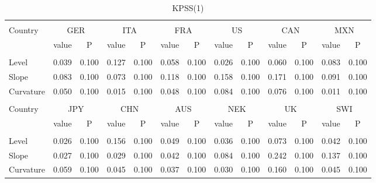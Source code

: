 \documentclass{article}
\begin{document}

\begin{table}[h]
\caption{KPSS(1)} %
\fontsize{10}{10}\selectfont
\centering%
\begin{tabular}{l cc cc cc cc cc cc}%
\hline\hline \\ [-1.5ex]                         %

Country	&	\multicolumn{2}{c}{GER}			&	\multicolumn{2}{c}{ITA}			&	\multicolumn{2}{c}{FRA}			&	\multicolumn{2}{c}{US}			&	\multicolumn{2}{c}{CAN}			&	\multicolumn{2}{c}{MXN}			\\[0.5ex] 

 & value &P & value &P& value &P & value &P& value &P & value &P\\

\hline       \\ [-1.5ex] 

Level	&	0.039	&	0.100	&	0.127	&	0.100	&	0.058	&	0.100	&	0.026	&	0.100	&	0.060	&	0.100	&	0.083	&	0.100	\\
Slope	&	0.083	&	0.100	&	0.073	&	0.100	&	0.118	&	0.100	&	0.158	&	0.100	&	0.171	&	0.100	&	0.091	&	0.100	\\
Curvature	&	0.050	&	0.100	&	0.015	&	0.100	&	0.048	&	0.100	&	0.084	&	0.100	&	0.076	&	0.100	&	0.011	&	0.100	\\


\hline\hline   \\ [-1.5ex]    

Country	&	\multicolumn{2}{c}{JPY}			&	\multicolumn{2}{c}{CHN}			&	\multicolumn{2}{c}{AUS}			&	\multicolumn{2}{c}{NEK}			&	\multicolumn{2}{c}{UK}			&	\multicolumn{2}{c}{SWI}			\\

 & value &P & value &P& value &P & value &P& value &P & value &P\\

\hline       \\ [-1.5ex] 

Level	&	0.026	&	0.100	&	0.156	&	0.100	&	0.049	&	0.100	&	0.036	&	0.100	&	0.073	&	0.100	&	0.042	&	0.100	\\
Slope	&	0.027	&	0.100	&	0.029	&	0.100	&	0.042	&	0.100	&	0.084	&	0.100	&	0.242	&	0.100	&	0.137	&	0.100	\\
Curvature	&	0.059	&	0.100	&	0.045	&	0.100	&	0.037	&	0.100	&	0.030	&	0.100	&	0.160	&	0.100	&	0.045	&	0.100	\\


\hline            
\end{tabular}
\label{table:nonlin}%
\end{table}
\end{document}
